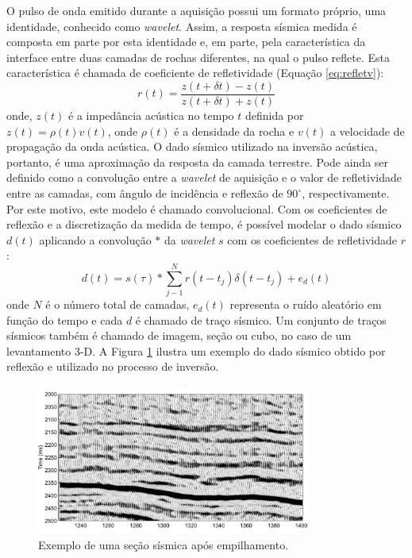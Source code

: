 O pulso de onda emitido durante a aquisição possui um formato próprio, uma identidade, 
conhecido como \textit{wavelet}. Assim, a resposta sísmica medida
é composta em parte por esta identidade e, em parte, pela característica da interface
entre duas camadas de rochas diferentes, na qual o pulso reflete.
Esta característica é chamada de coeficiente de refletividade (Equação \ref{eq:refletv}):
\begin{equation}
r(t) = \frac{z(t+\delta t)-z(t)}{z(t+\delta t)+z(t)}
\label{eq:refletv}
\end{equation}
onde, $z(t)$ é a impedância acústica no tempo $t$ definida por
$z(t)=\rho(t)v(t)$, onde $\rho(t)$ é a densidade da rocha e $v(t)$ a
velocidade de propagação da onda acústica.
O dado sísmico utilizado na inversão acústica, portanto,
é uma aproximação da resposta da camada terrestre. Pode ainda ser definido como
a convolução entre a \textit{wavelet} de aquisição e o valor de refletividade entre as
camadas, com ângulo de incidência e reflexão de $90^\circ$,
respectivamente. Por este motivo, este modelo é chamado convolucional.
Com os coeficientes de reflexão e a discretização da medida de tempo, é possível
modelar o dado sísmico $d(t)$ aplicando a convolução $*$
da \textit{wavelet} $s$ com os coeficientes de refletividade $r$:
\begin{equation}
d(t) = s(\tau) * \sum_{j-1}^{N}{r(t- t_j) \delta(t - t_j) + e_d(t)}
\end{equation}
onde $N$ é o número total de camadas, $e_d(t)$ representa o ruído aleatório em função do tempo
e cada $d$ é chamado de traço sísmico. Um conjunto de traços
sísmicos também é chamado de imagem, seção ou cubo, no caso de um
levantamento 3-D.
A Figura \ref{fig:seismicpos} ilustra um exemplo do dado sísmico obtido por reflexão e utilizado
no processo de inversão. 

\begin{figure}[ht!]
\begin{center}
  \includegraphics[width=0.8\textwidth]{fig/seismicpos}
  \caption{Exemplo de uma seção sísmica após empilhamento. \citep{Buland01012003}}
  \label{fig:seismicpos}
\end{center}
\end{figure}


